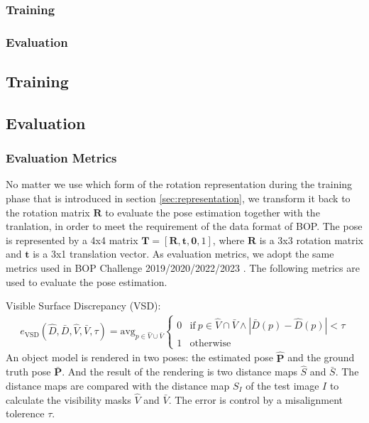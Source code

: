 \documentclass[12pt,DIV14,BCOR12mm,a4paper,footinclude=false,headinclude,parskip=half-,twoside,openright,cleardoublepage=empty,toc=index,bibliography=totoc,listof=totoc]{scrreprt}
\numberwithin{equation}{chapter}
\begin{document}
\subsubsection{Training} 
\subsubsection{Evaluation}
\subsection{Training} 
\subsection{Evaluation}
\subsubsection{Evaluation Metrics}
No matter we use which form of the rotation representation during the training phase that is introduced in section \ref{sec:representation}, we transform it back to the rotation matrix $\mathbf{R}$ to evaluate the pose estimation together with the tranlation, in order to meet the requirement of the data format of BOP. The pose is represented by a 4x4 matrix $\mathbf{T}=[\mathbf{R},\mathbf{t},\mathbf{0},1]$, where $\mathbf{R}$ is a 3x3 rotation matrix and $\mathbf{t}$ is a 3x1 translation vector. As evaluation metrics, we adopt the same metrics used in BOP Challenge 2019/2020/2022/2023 \cite{hodan2018bop,hodan2020bop}. The following metrics are used to evaluate the pose estimation.

Visible Surface Discrepancy (VSD): 
\begin{align}
 e_{\text{VSD}}\left(\hat{D},\bar{D},\hat{V},\bar{V},\tau\right)=\text{avg}_{p\in \hat{V}\cup \bar{V}}
  \begin{cases}
    0 & \text{if} \ p\in \hat{V}\cap  \bar{V} \land \left|\bar{D}(p)-\hat{D}(p)\right|<\tau\\
    1 & \text{otherwise}
  \end{cases}
\end{align}
An object model is rendered in two poses: the estimated pose $\mathbf{\hat{P}}$ and the ground truth pose $\mathbf{\bar{P}}$. And the result of the rendering is two distance maps $\hat{S}$ and $\bar{S}$. The distance maps are compared with the distance map $S_I$ of the test image $I$ to calculate the visibility masks $\hat{V}$ and $\bar{V}$. The error is control by a misalignment tolerence $\tau$.
\end{document}
